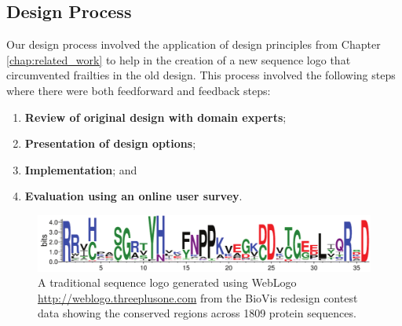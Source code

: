 
\subsection{Design Process}

Our design process involved the application of design principles from Chapter \ref{chap:related_work} to help in the creation of a new sequence logo that circumvented frailties in the old design.
This process involved the following steps where there were both feedforward and feedback steps:

\begin{enumerate}
\item\textbf{Review of original design with domain experts}; 
\item\textbf{Presentation of design options};
\item\textbf{Implementation}; and
\item\textbf{Evaluation using an online user survey}.
\end{enumerate}

\begin{figure}[t!]
\centering
\includegraphics[width=\textwidth]{images/other_glyphs/sequence_logo/old-sequence-logo}
\caption{A traditional sequence logo generated using WebLogo \url{http://weblogo.threeplusone.com} from the BioVis redesign contest data \cite{biovis_redesign} showing the conserved regions across 1809 protein sequences.}
\label{fig:sequence_logo_design_teaser}
\end{figure}

